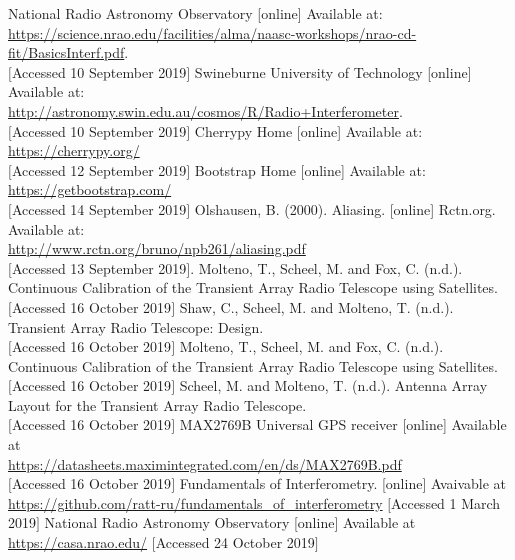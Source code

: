 \newpage
\begin{thebibliography}{9}
National Radio Astronomy Observatory [online] Available at:\\
\url{https://science.nrao.edu/facilities/alma/naasc-workshops/nrao-cd-fit/BasicsInterf.pdf}. \\
$[$Accessed 10 September 2019$]$
Swineburne University of Technology [online] Available at:\\
\url{http://astronomy.swin.edu.au/cosmos/R/Radio+Interferometer}. \\
$[$Accessed 10 September 2019$]$
Cherrypy Home [online] Available at:\\
\url{https://cherrypy.org/}\\
$[$Accessed 12 September 2019$]$
Bootstrap Home [online] Available at:\\
\url{https://getbootstrap.com/}\\
$[$Accessed 14 September 2019$]$
Olshausen, B. (2000). Aliasing. [online] Rctn.org. Available at:\\
\url{http://www.rctn.org/bruno/npb261/aliasing.pdf}\\
$[$Accessed 13 September 2019$]$.
Molteno, T., Scheel, M. and Fox, C. (n.d.). Continuous Calibration of the Transient Array Radio Telescope using Satellites.\\
$[$Accessed 16 October 2019$]$
Shaw, C., Scheel, M. and Molteno, T. (n.d.). Transient Array Radio Telescope: Design.\\
$[$Accessed 16 October 2019$]$
Molteno, T., Scheel, M. and Fox, C. (n.d.). Continuous Calibration of the Transient Array Radio Telescope using Satellites.\\
$[$Accessed 16 October 2019$]$
Scheel, M. and Molteno, T. (n.d.). Antenna Array Layout for the Transient Array Radio Telescope.\\
$[$Accessed 16 October 2019$]$
MAX2769B Universal GPS receiver [online] Available at\\
\url{https://datasheets.maximintegrated.com/en/ds/MAX2769B.pdf}\\
$[$Accessed 16 October 2019$]$
Fundamentals of Interferometry. [online] Avaivable at\\
\url{https://github.com/ratt-ru/fundamentals_of_interferometry}
$[$Accessed 1 March 2019$]$
National Radio Astronomy Observatory [online] Available at\\
\url{https://casa.nrao.edu/}
$[$Accessed 24 October 2019$]$

\end{thebibliography}

